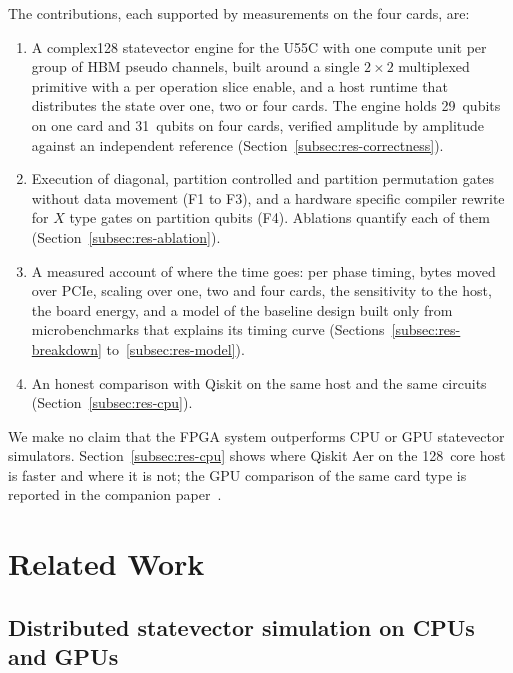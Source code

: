 \documentclass[pdflatex,sn-mathphys-num]{sn-jnl}
\newcommand{\NumHostCores}{128}
\newcommand{\NumMaxWidthFourCards}{31}
\newcommand{\NumMaxWidthOneCard}{29}
\theoremstyle{thmstyleone}
\theoremstyle{thmstylethree}
\begin{document}
The contributions, each supported by measurements on the four cards, are:
\begin{enumerate}
\item A complex128 statevector engine for the U55C with one compute unit per group of HBM pseudo channels, built
around a single $2\times2$ multiplexed primitive with a per operation slice enable, and a host runtime that distributes
the state over one, two or four cards. The engine holds \NumMaxWidthOneCard~qubits on one card and
\NumMaxWidthFourCards~qubits on four cards, verified amplitude by amplitude against an independent reference
(Section~\ref{subsec:res-correctness}).
\item Execution of diagonal, partition controlled and partition permutation gates without data movement (F1 to F3),
and a hardware specific compiler rewrite for $X$ type gates on partition qubits (F4). Ablations quantify each of
them (Section~\ref{subsec:res-ablation}).
\item A measured account of where the time goes: per phase timing, bytes moved over PCIe, scaling over one, two and
four cards, the sensitivity to the host, the board energy, and a model of the baseline design built only from
microbenchmarks that explains its timing curve (Sections~\ref{subsec:res-breakdown} to~\ref{subsec:res-model}).
\item An honest comparison with Qiskit on the same host and the same circuits (Section~\ref{subsec:res-cpu}).
\end{enumerate}
We make no claim that the FPGA system outperforms CPU or GPU statevector simulators. Section~\ref{subsec:res-cpu} shows
where Qiskit Aer on the \NumHostCores~core host is faster and where it is not; the GPU comparison of the same card type is
reported in the companion paper~\cite{tiwari2026fpga30}.
\section{Related Work}\label{sec:related}

\subsection{Distributed statevector simulation on CPUs and GPUs}\label{subsec:related-dist}
\end{document}
